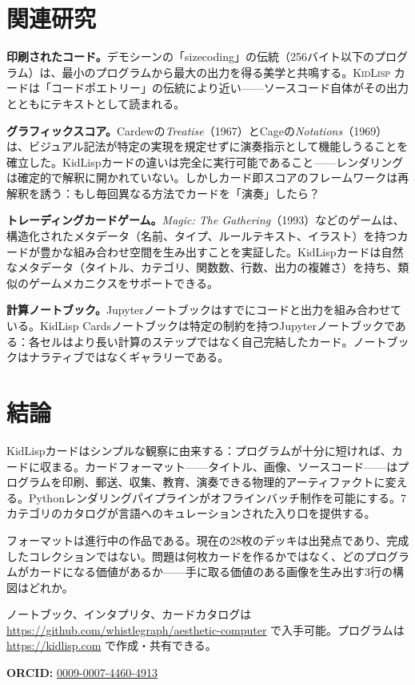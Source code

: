 \documentclass[10pt,letterpaper,twocolumn]{article}
\newcommand{\kidlisp}{\textsc{KidLisp}}
\begin{document}
\section{関連研究}

\textbf{印刷されたコード。}デモシーンの「sizecoding」の伝統（256バイト以下のプログラム）は、最小のプログラムから最大の出力を得る美学と共鳴する。\kidlisp{} カードは「コードポエトリー」の伝統により近い——ソースコード自体がその出力とともにテキストとして読まれる。

\textbf{グラフィックスコア。}Cardewの\emph{Treatise}（1967）とCageの\emph{Notations}（1969）は、ビジュアル記法が特定の実現を規定せずに演奏指示として機能しうることを確立した。KidLispカードの違いは完全に実行可能であること——レンダリングは確定的で解釈に開かれていない。しかしカード即スコアのフレームワークは再解釈を誘う：もし毎回異なる方法でカードを「演奏」したら？

\textbf{トレーディングカードゲーム。}\emph{Magic: The Gathering}（1993）などのゲームは、構造化されたメタデータ（名前、タイプ、ルールテキスト、イラスト）を持つカードが豊かな組み合わせ空間を生み出すことを実証した。KidLispカードは自然なメタデータ（タイトル、カテゴリ、関数数、行数、出力の複雑さ）を持ち、類似のゲームメカニクスをサポートできる。

\textbf{計算ノートブック。}Jupyterノートブックはすでにコードと出力を組み合わせている。KidLisp Cardsノートブックは特定の制約を持つJupyterノートブックである：各セルはより長い計算のステップではなく自己完結したカード。ノートブックはナラティブではなくギャラリーである。


\section{結論}

KidLispカードはシンプルな観察に由来する：プログラムが十分に短ければ、カードに収まる。カードフォーマット——タイトル、画像、ソースコード——はプログラムを印刷、郵送、収集、教育、演奏できる物理的アーティファクトに変える。Pythonレンダリングパイプラインがオフラインバッチ制作を可能にする。7カテゴリのカタログが言語へのキュレーションされた入り口を提供する。

フォーマットは進行中の作品である。現在の28枚のデッキは出発点であり、完成したコレクションではない。問題は何枚カードを作るかではなく、どのプログラムがカードになる価値があるか——手に取る価値のある画像を生み出す3行の構図はどれか。

ノートブック、インタプリタ、カードカタログは \url{https://github.com/whistlegraph/aesthetic-computer} で入手可能。プログラムは \url{https://kidlisp.com} で作成・共有できる。

\vspace{0.5em}
\noindent\textbf{ORCID:} \href{https://orcid.org/0009-0007-4460-4913}{0009-0007-4460-4913}




\end{document}
